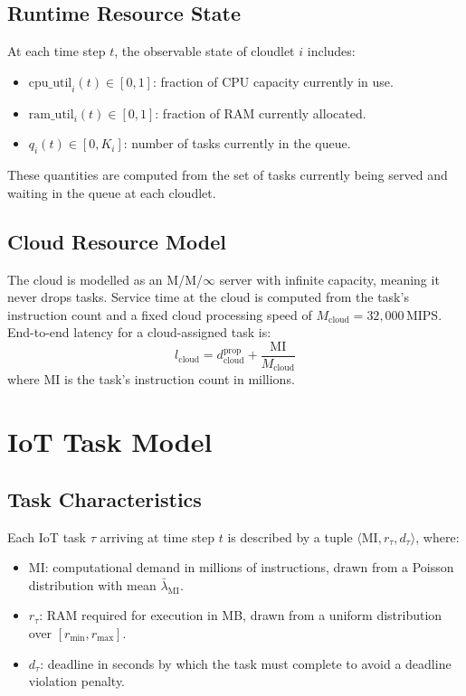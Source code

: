 \subsection{Runtime Resource State}

At each time step $t$, the observable state of cloudlet $i$
includes:
\begin{itemize}
  \item $\text{cpu\_util}_i(t) \in [0,1]$: fraction of CPU
  capacity currently in use.
  \item $\text{ram\_util}_i(t) \in [0,1]$: fraction of RAM
  currently allocated.
  \item $q_i(t) \in [0, K_i]$: number of tasks currently in the
  queue.
\end{itemize}

These quantities are computed from the set of tasks currently
being served and waiting in the queue at each cloudlet.

\subsection{Cloud Resource Model}

The cloud is modelled as an M/M/$\infty$ server with infinite
capacity, meaning it never drops tasks. Service time at the cloud
is computed from the task's instruction count and a fixed cloud
processing speed of $M_{\text{cloud}} = 32{,}000$\,MIPS.
End-to-end latency for a cloud-assigned task is:
\begin{equation}
  l_{\text{cloud}} = d_{\text{cloud}}^{\text{prop}}
  + \frac{\text{MI}}{ M_{\text{cloud}} }
  \label{eq:cloud_latency}
\end{equation}
where MI is the task's instruction count in millions.

\section{IoT Task Model}
\label{sec:task_model}

\subsection{Task Characteristics}

Each IoT task $\tau$ arriving at time step $t$ is described by a
tuple $\langle \text{MI}, r_{\tau}, d_{\tau} \rangle$, where:
\begin{itemize}
  \item $\text{MI}$: computational demand in millions of
  instructions, drawn from a Poisson distribution with mean
  $\bar{\lambda}_{\text{MI}}$.
  \item $r_{\tau}$: RAM required for execution in MB, drawn from
  a uniform distribution over $[r_{\min}, r_{\max}]$.
  \item $d_{\tau}$: deadline in seconds by which the task must
  complete to avoid a deadline violation penalty.
\end{itemize}

